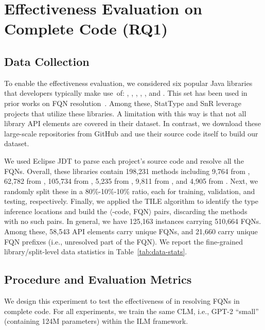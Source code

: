 \section{Effectiveness Evaluation on Complete Code (RQ1)}
\label{sec:effectiveness-eval}

\subsection{Data Collection}\label{sec:effectiveness-data}



To enable the effectiveness evaluation, we considered six popular Java libraries that developers typically make use~of: , , , , , and . This set has been used in prior works on FQN resolution~\cite{icse18, snr-icse22, prompt-ase22}. Among these, StatType\cite{icse18} and SnR\cite{snr-icse22} leverage projects that utilize these libraries. A limitation with this way is that not all library API elements are covered in their dataset. In contrast, we download these large-scale repositories from GitHub and use their source code itself to build our dataset.

We used Eclipse JDT to parse each project’s source code and resolve
all the FQNs.
Overall, these libraries contain 198,231 methods including 9,764 from
, 62,782 from , 105,734 from
, 5,235 from , 9,811 from
, and 4,905 from . Next, we randomly
split these in a 80\%-10\%-10\% ratio, each for training, validation,
and testing, respectively. Finally, we applied the TILE algorithm to
identify the type inference locations and build the
$\langle$\blank-code, FQN$\rangle$ pairs, discarding the methods with
no such pairs. In general, we have 125,163 instances carrying 510,664
FQNs. Among these, 58,543 API elements carry unique FQNs, and 21,660
carry unique FQN prefixes (i.e., unresolved part of the FQN). We
report the fine-grained library/split-level data statistics in
Table~\ref{tab:data-stats}.

\subsection{Procedure and Evaluation Metrics}\label{sec:effectiveness-eval-proc}
We design this experiment to test the effectiveness of \tool in resolving FQNs in complete code. For all experiments, we train the same CLM, i.e., GPT-2 “small” (containing 124M parameters) within the ILM framework.

